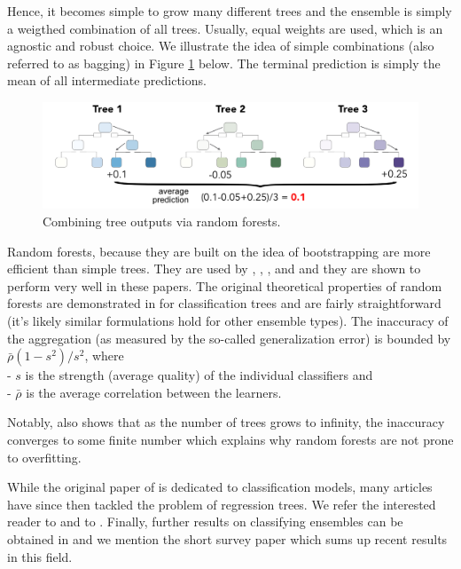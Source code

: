 \documentclass[]{krantz}
\theoremstyle{definition}
\theoremstyle{definition}
\theoremstyle{definition}
\theoremstyle{remark}
\begin{document}
Hence, it becomes simple to grow many different trees and the ensemble
is simply a weigthed combination of all trees. Usually, equal weights
are used, which is an agnostic and robust choice. We illustrate the idea
of simple combinations (also referred to as bagging) in Figure
\ref{fig:RF} below. The terminal prediction is simply the mean of all
intermediate predictions.

\begin{figure}[b]
\includegraphics[width=22.96in]{images/tree_RF} \caption{Combining tree outputs via random forests.}\label{fig:RF}
\end{figure}

Random forests, because they are built on the idea of bootstrapping are
more efficient than simple trees. They are used by
\citet{ballings2015evaluating}, \citet{patel2015predicting},
\citet{krauss2017deep}, and \citet{huck2019large} and they are shown to
perform very well in these papers. The original theoretical properties
of random forests are demonstrated in \citet{breiman2001random} for
classification trees and are fairly straightforward (it's likely similar
formulations hold for other ensemble types). The inaccuracy of the
aggregation (as measured by the so-called generalization error) is
bounded by \(\bar{\rho}(1-s^2)/s^2\), where\\
- \(s\) is the strength (average quality) of the individual classifiers
and\\
- \(\bar{\rho}\) is the average correlation between the learners.

Notably, \citet{breiman2001random} also shows that as the number of
trees grows to infinity, the inaccuracy converges to some finite number
which explains why random forests are not prone to overfitting.

While the original paper of \citet{breiman2001random} is dedicated to
classification models, many articles have since then tackled the problem
of regression trees. We refer the interested reader to
\citet{biau2012analysis} and to \citet{scornet2015consistency}. Finally,
further results on classifying ensembles can be obtained in
\citet{biau2008consistency} and we mention the short survey paper
\citet{denil2014narrowing} which sums up recent results in this field.
\end{document}

